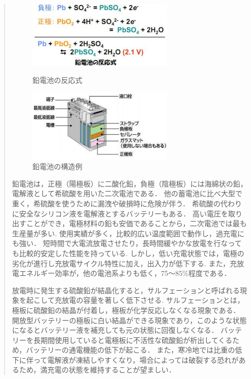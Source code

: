 \documentclass[a4paper,12pt,showkeys]{jreport}
\begin{document}
\begin{quotation}

\begin{figure}[h]
 \begin{minipage}{0.5\hsize}
  \begin{center}
   \includegraphics[width=70mm,clip]{namari1.eps}
  \end{center}
  \caption{鉛電池の反応式\cite{蓄電池}}
  \label{fig:one}
 \end{minipage}
 \begin{minipage}{0.5\hsize}
  \begin{center}
   \includegraphics[width=70mm,clip]{namari2.eps}
  \end{center}
  \caption{鉛電池の構造例\cite{蓄電池}}
  \label{fig:two}
 \end{minipage}
\end{figure}


鉛電池は，正極（陽極板）に二酸化鉛，負極（陰極板）には海綿状の鉛，電解液として希硫酸を用いた二次電池である．
他の蓄電池に比べ大型で重く，希硫酸を使うために漏洩や破損時に危険が伴う．
希硫酸の代わりに安全なシリコン液を電解液とするバッテリーもある．
高い電圧を取り出すことができ，電極材料の鉛も安価であることから，二次電池では最も生産量が多い.
使用実績が多く，比較的広い温度範囲で動作し，過充電にも強い．
短時間で大電流放電させたり，長時間緩やかな放電を行なっても比較的安定した性能を持っている.
しかし，低い充電状態では，電極の劣化が進行し充放電サイクル特性に加え，出入力が低下する.
また，充放電エネルギー効率が，他の電池系よりも低く，75～85\%程度である．

放電時に発生する硫酸鉛が結晶化すると，サルフェーションと呼ばれる現象を起こして充放電の容量を著しく低下させる.
サルフェーションとは，極板に硫酸鉛の結晶が付着し，極板が化学反応しなくなる現象である．
開放型バッテリーの極板に白い結晶ができる現象であり，このような状態になるとバッテリー液を補充しても元の状態に回復しなくなる．
バッテリーを長期間使用していると電極板に不活性な硫酸鉛が析出してくるため，バッテリーの通電機能の低下が起こる．
また，寒冷地では比重の低下に伴って電解液が凍結しやすくなり，場合によっては破裂する恐れがあるため，満充電の状態を維持することが望ましい\cite{蓄電池}．

\end{quotation}
\end{document}
